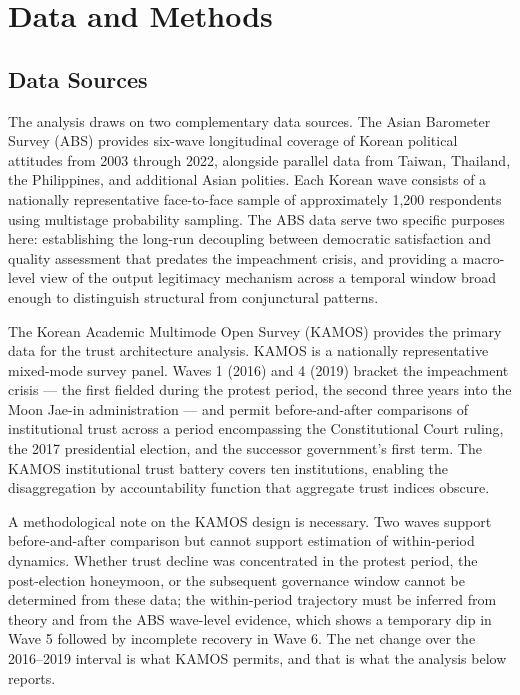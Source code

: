 \documentclass[
  12pt,
  letterpaper]{article}
\begin{document}
\section{Data and Methods}\label{data-and-methods}

\subsection{Data Sources}\label{data-sources}

The analysis draws on two complementary data sources. The Asian
Barometer Survey (ABS) provides six-wave longitudinal coverage of Korean
political attitudes from 2003 through 2022, alongside parallel data from
Taiwan, Thailand, the Philippines, and additional Asian polities. Each
Korean wave consists of a nationally representative face-to-face sample
of approximately 1,200 respondents using multistage probability
sampling. The ABS data serve two specific purposes here: establishing
the long-run decoupling between democratic satisfaction and quality
assessment that predates the impeachment crisis, and providing a
macro-level view of the output legitimacy mechanism across a temporal
window broad enough to distinguish structural from conjunctural
patterns.

The Korean Academic Multimode Open Survey (KAMOS) provides the primary
data for the trust architecture analysis. KAMOS is a nationally
representative mixed-mode survey panel. Waves 1 (2016) and 4 (2019)
bracket the impeachment crisis --- the first fielded during the protest
period, the second three years into the Moon Jae-in administration ---
and permit before-and-after comparisons of institutional trust across a
period encompassing the Constitutional Court ruling, the 2017
presidential election, and the successor government's first term. The
KAMOS institutional trust battery covers ten institutions, enabling the
disaggregation by accountability function that aggregate trust indices
obscure.

A methodological note on the KAMOS design is necessary. Two waves
support before-and-after comparison but cannot support estimation of
within-period dynamics. Whether trust decline was concentrated in the
protest period, the post-election honeymoon, or the subsequent
governance window cannot be determined from these data; the
within-period trajectory must be inferred from theory and from the ABS
wave-level evidence, which shows a temporary dip in Wave 5 followed by
incomplete recovery in Wave 6. The net change over the 2016--2019
interval is what KAMOS permits, and that is what the analysis below
reports.
\end{document}
